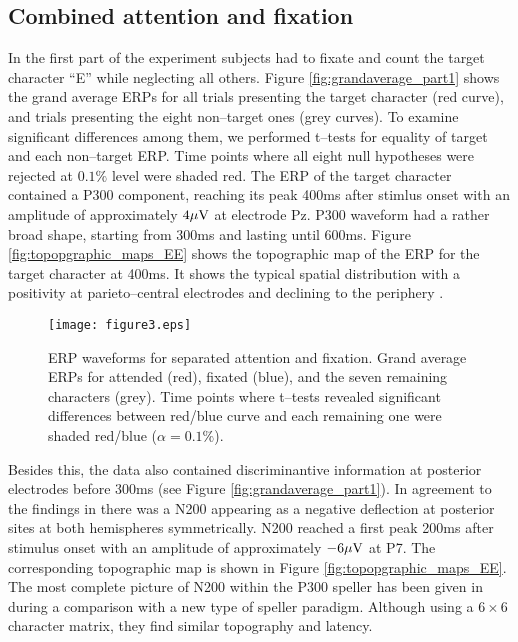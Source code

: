 \documentclass[a4paper,twocolumn]{article}
\begin{document}
\subsection*{Combined attention and fixation}
In the first part of the experiment subjects had to fixate and count the target character ``E'' while neglecting all others. Figure \ref{fig:grandaverage_part1} shows the grand average ERPs for all trials presenting the target character (red curve), and trials presenting the eight non--target ones (grey curves). To examine significant differences among them, we performed t--tests for equality of target and each non--target ERP. Time points where all eight null hypotheses were rejected at $0.1\%$ level were shaded red. 
The ERP of the target character contained a P300 component, reaching its peak 400ms after stimlus onset with an amplitude of approximately $4\mu\rm{V}$ at electrode Pz. P300 waveform had a rather broad shape, starting from 300ms and lasting until 600ms. Figure \ref{fig:topopgraphic_maps_EE} shows the topographic map of the ERP for the target character at 400ms. It shows the typical spatial distribution with a positivity at parieto--central electrodes and declining to the periphery \cite{Sutton1965,Farwell1988}.  
\begin{figure*}[t!!]
\begin{center}
\texttt{[image: figure3.eps]}
\end{center}
\caption{{ERP waveforms for separated attention and fixation.} Grand average ERPs for attended (red), fixated (blue), and the seven remaining characters (grey). Time points where t--tests revealed significant differences between red/blue curve and each remaining one were shaded red/blue ($\alpha=0.1\%$). }
\label{fig:grandaverage_part2}
\end{figure*}
Besides this, the data also contained discriminantive information at posterior electrodes before 300ms (see Figure \ref{fig:grandaverage_part1}). In agreement to the findings in \cite{Krusienski2008,Hoffmann2008,Hong2009} there was a N200 appearing as a negative deflection at posterior sites at both hemispheres symmetrically. N200 reached a first peak 200ms after stimulus onset with an amplitude of approximately $-6  \mu\rm{V}$ at P7. The corresponding topographic map is shown in Figure \ref{fig:topopgraphic_maps_EE}. The most complete picture of N200 within the P300 speller has been given in \cite{Hong2009} during a comparison with a new type of speller paradigm.  Although using a $6\times6$ character matrix, they find similar topography and latency.
\end{document}
